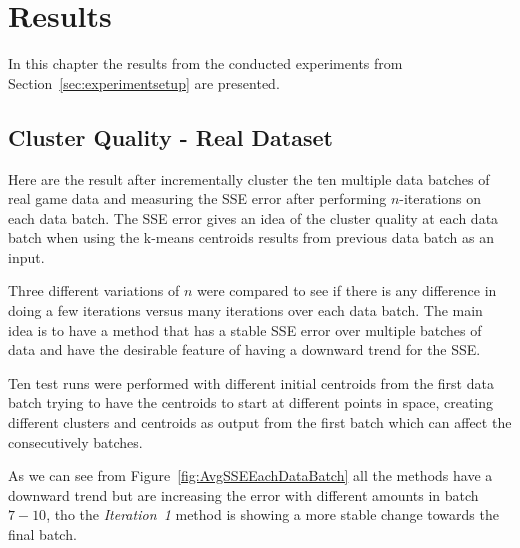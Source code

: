 
\chapter{Results} %
\label{Chapter5}

In this chapter the results from the conducted experiments from Section~\ref{sec:experimentsetup} are presented.

\section{Cluster Quality - Real Dataset}
\label{sec:cq_realdataset}
Here are the result after incrementally cluster the ten multiple data batches of real game data and measuring the SSE error after performing $n$-iterations on each data batch. The SSE error gives an idea of the cluster quality at each data batch when using the k-means centroids results from previous data batch as an input.

Three different variations of $n$ were compared to see if there is any difference in doing a few iterations versus many iterations over each data batch. The main idea is to have a method that has a stable SSE error over multiple batches of data and have the desirable feature of having a downward trend for the SSE. 

Ten test runs were performed with different initial centroids from the first data batch trying to have the centroids to start at different points in space, creating different clusters and centroids as output from the first batch which can affect the consecutively batches. 

As we can see from Figure~\ref{fig:AvgSSEEachDataBatch} all the methods have a downward trend but are increasing the error with different amounts in batch $7-10$, tho the \textit{Iteration~1} method is showing a more stable change towards the final batch.


